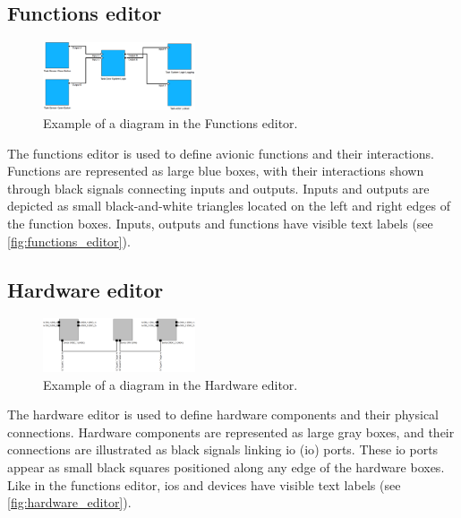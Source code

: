 \subsection{Functions editor}
\label{sec:functions_editor}
\begin{figure}[h]
    \centering
    \includegraphics[width=0.4\textwidth]{pictures/functions_editor.png}
    \caption[Example of a diagram in the Functions editor]{Example of a diagram in the Functions editor.}
    \label{fig:functions_editor}
\end{figure}
The functions editor is used to define avionic functions and their interactions. Functions are represented as large blue boxes, with their interactions shown through black signals connecting inputs and outputs. Inputs and outputs are depicted as small black-and-white triangles located on the left and right edges of the function boxes. Inputs, outputs and functions have visible text labels (see \autoref{fig:functions_editor}).

\subsection{Hardware editor}
\label{sec:hardware_editor}
\begin{figure}[h]
    \centering
    \includegraphics[width=0.4\textwidth]{pictures/hardware_editor.png}
    \caption[Example of a diagram in the Hardware editor]{Example of a diagram in the Hardware editor.}
    \label{fig:hardware_editor}
\end{figure}
The hardware editor is used to define hardware components and their physical connections. Hardware components are represented as large gray boxes, and their connections are illustrated as black signals linking \acrlong{io} (\acrshort{io}) ports. These \acrshort{io} ports appear as small black squares positioned along any edge of the hardware boxes. Like in the functions editor, \acrshort{io}s and devices have visible text labels (see \autoref{fig:hardware_editor}).

